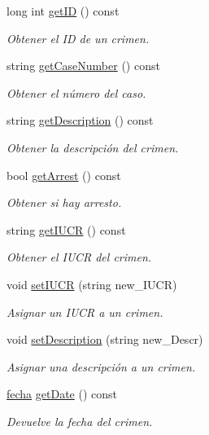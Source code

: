 \begin{DoxyCompactItemize}
long int \hyperlink{classcrimen_aa33f92f889c7f1815ed4bfd56c578bce}{get\+I\+D} () const 
\begin{DoxyCompactList}\small\item\em Obtener el I\+D de un crimen. \end{DoxyCompactList}\item 
string \hyperlink{classcrimen_ab3c025eb20cdcea9192ee190fa2af015}{get\+Case\+Number} () const 
\begin{DoxyCompactList}\small\item\em Obtener el número del caso. \end{DoxyCompactList}\item 
string \hyperlink{classcrimen_a61789d65209d167149df197272d8feba}{get\+Description} () const 
\begin{DoxyCompactList}\small\item\em Obtener la descripción del crimen. \end{DoxyCompactList}\item 
bool \hyperlink{classcrimen_a6cab67bfdad566ce444236fc7c8df312}{get\+Arrest} () const 
\begin{DoxyCompactList}\small\item\em Obtener si hay arresto. \end{DoxyCompactList}\item 
string \hyperlink{classcrimen_a8738020069c3a3b3500d044f9580f93a}{get\+I\+U\+C\+R} () const 
\begin{DoxyCompactList}\small\item\em Obtener el I\+U\+C\+R del crimen. \end{DoxyCompactList}\item 
void \hyperlink{classcrimen_a1f64e937436244d47af1f92cb63c7254}{set\+I\+U\+C\+R} (string new\+\_\+\+I\+U\+C\+R)
\begin{DoxyCompactList}\small\item\em Asignar un I\+U\+C\+R a un crimen. \end{DoxyCompactList}\item 
void \hyperlink{classcrimen_aa2f141046bf44d87e5bc25ae197dcbd0}{set\+Description} (string new\+\_\+\+Descr)
\begin{DoxyCompactList}\small\item\em Asignar una descripción a un crimen. \end{DoxyCompactList}\item 
\hyperlink{classfecha}{fecha} \hyperlink{classcrimen_a8a6712e536211034819441ab87e1c215}{get\+Date} () const 
\begin{DoxyCompactList}\small\item\em Devuelve la fecha del crimen. \end{DoxyCompactList}\item 

\end{DoxyCompactItemize}
